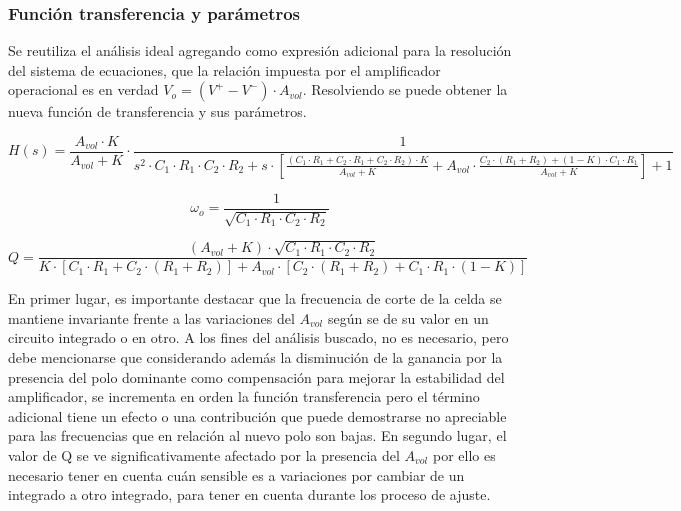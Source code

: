 \subsubsection{Funci\'on transferencia y par\'ametros}
Se reutiliza el an\'alisis ideal agregando como expresi\'on adicional para la resoluci\'on del sistema de ecuaciones,
que la relaci\'on impuesta por el amplificador operacional es en verdad $V_o = (V^{+} - V^{-}) \cdot A_{vol}$. Resolviendo
se puede obtener la nueva funci\'on de transferencia y sus par\'ametros.

\begin{equation*}
H(s) = \frac{A_{vol} \cdot K}{A_{vol} + K} \cdot \frac{1}
{s^{2} \cdot C_1 \cdot R_1 \cdot C_2 \cdot R_2
	+ s \cdot \left[ \frac{(C_1 \cdot R_1 + C_2 \cdot R_1 + C_2 \cdot R_2) \cdot K}{A_{vol} + K} + A_{vol} \cdot \frac{C_2 \cdot (R_1 + R_2) + (1 - K) \cdot C_1 \cdot R_1}{A_{vol} + K} \right]
	+1}
\label{eq:transferencia_sallen_key_real}
\end{equation*}

\begin{equation}
\omega_o = \frac{1}{\sqrt{C_1 \cdot R_1 \cdot C_2 \cdot R_2}}
\end{equation}

\begin{equation}
Q = \frac{(A_{vol} + K) \cdot \sqrt{C_1 \cdot R_1 \cdot C_2 \cdot R_2}}{K \cdot \left[ C_1 \cdot R_1 + C_2 \cdot (R_1 + R_2) \right] + A_{vol} \cdot \left[ C_2 \cdot (R_1 + R_2) + C_1 \cdot R_1 \cdot (1 - K) \right]}
\end{equation}

En primer lugar, es importante destacar que la frecuencia de corte de la celda se mantiene invariante frente a las variaciones del $A_{vol}$ seg\'un se de su valor en un circuito integrado o en otro. A los fines del an\'alisis buscado,
no es necesario, pero debe mencionarse que considerando adem\'as la disminuci\'on de la ganancia por la presencia del polo dominante como compensaci\'on para mejorar la estabilidad del amplificador, se incrementa en orden la funci\'on transferencia pero
el t\'ermino adicional tiene un efecto o una contribuci\'on que puede demostrarse no apreciable para las frecuencias que en relaci\'on al nuevo polo son bajas.
En segundo lugar, el valor de Q se ve significativamente afectado por la presencia del $A_{vol}$ por ello es necesario tener en cuenta cu\'an sensible es a variaciones por cambiar de un integrado a otro integrado,
para tener en cuenta durante los proceso de ajuste.

